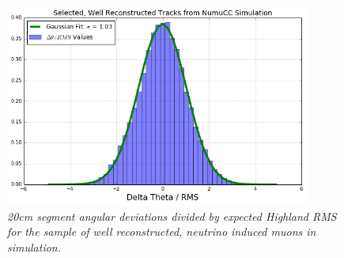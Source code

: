 \begin{figure}[h!]
\begin{center}
\includegraphics[width=100mm]{Figures/Highland_validation_MCNuRecoTracks_muon.png}
\end{center}
\caption{\textit{20cm segment angular deviations divided by expected Highland RMS for the sample of well reconstructed, neutrino induced muons in simulation.}}
\label{Highland_validation_MCNuRecoTracks_fig}
\end{figure}